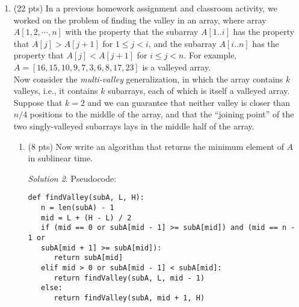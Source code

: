 \documentclass[12pt]{article}
\theoremstyle{remark}
\newtheorem*{solution}{Solution}
\begin{document}
\begin{enumerate}
4 2 6 5

\begin{enumerate}
\item (10 pts) Write a non-greedy, efficient and optimal algorithm for a strategy to play EPIC!. The runtime needs to be less than or equal to $\theta(n^2)$. Player 1 will use this strategy and Player 2 will use a greedy strategy of choosing the smallest card. \textbf{Note: Your choice of algorithmic strategy really matters here. Think about the types of algorithms we've learned this semester when making your choice.} You need to provide an explanation of how your algorithm works to receive credit for this question.
    \begin{solution}
    
    \end{solution}
    \pagebreak

\item (15 pts) Implement your strategy and the greedy strategy in Python and include code to simulate a game. Your simulation work for up to 100 cards, and values ranging from 1 to 100. Your simulation should include a randomly generated collection of cards and show the sum of cards in each hand at the end of the game. 
\end{enumerate}

\pagebreak
\item (22 pts) 
	In a previous homework assignment and classroom activity, we worked on the problem of finding the valley in an array, where array $A[1, 2, \cdots, n]$ with the property that the subarray $A[1..i]$ has the property that $A[j]>A[j+1]$ for $1\leq j< i$, and the subarray $A[i..n]$ has the property that $A[j]<A[j+1]$ for $i\leq j < n$. For example, $A=[16, 15, 10, 9, 7, 3, 6, 8, 17, 23]$ is a valleyed array.\\
	
	Now consider the \textit{multi-valley} generalization, in which the array contains $k$ valleys, i.e., it contains $k$ subarrays, each of which is itself a valleyed array. Suppose that $k=2$ and we can guarantee that neither valley is closer than $n/4$ positions to the middle of the array, and that the ``joining point'' of the two singly-valleyed subarrays lays in the middle half of the array. 
	\begin{enumerate}
	    \item (8 pts) Now write an algorithm that returns the minimum element of $A$ in sublinear time.
	    \begin{solution} Pseudocode: \\
\begin{verbatim}
def findValley(subA, L, H):
   n = len(subA) - 1
   mid = L + (H - L) / 2
   if (mid == 0 or subA[mid - 1] >= subA[mid]) and (mid == n - 1 or
   subA[mid + 1] >= subA[mid]):
      return subA[mid]
   elif mid > 0 or subA[mid - 1] < subA[mid]:
      return findValley(subA, L, mid - 1)
   else:
      return findValley(subA, mid + 1, H)


\end{verbatim}
\end{solution}
\end{enumerate}
\end{enumerate}
\end{document}
